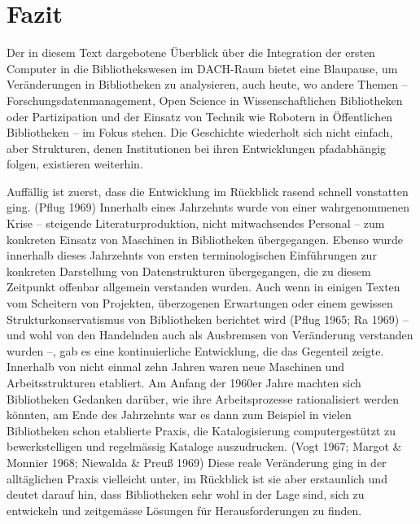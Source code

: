 \documentclass[a4paper,
fontsize=11pt,
oneside,
numbers=noperiodatend,
parskip=half-,
bibliography=totoc,
final
]{scrartcl}
\begin{document}
\hypertarget{fazit}{%
\section{Fazit}\label{fazit}}

Der in diesem Text dargebotene Überblick über die Integration der ersten
Computer in die Bibliothekswesen im DACH-Raum bietet eine Blaupause, um
Veränderungen in Bibliotheken zu analysieren, auch heute, wo andere
Themen -- Forschungsdatenmanagement, Open Science in Wissenschaftlichen
Bibliotheken oder Partizipation und der Einsatz von Technik wie Robotern
in Öffentlichen Bibliotheken -- im Fokus stehen. Die Geschichte
wiederholt sich nicht einfach, aber Strukturen, denen Institutionen bei
ihren Entwicklungen pfadabhängig folgen, existieren weiterhin.

Auffällig ist zuerst, dass die Entwicklung im Rückblick rasend schnell
vonstatten ging. (Pflug 1969) Innerhalb eines Jahrzehnts wurde von einer
wahrgenommenen Krise -- steigende Literaturproduktion, nicht
mitwachsendes Personal -- zum konkreten Einsatz von Maschinen in
Bibliotheken übergegangen. Ebenso wurde innerhalb dieses Jahrzehnts von
ersten terminologischen Einführungen zur konkreten Darstellung von
Datenstrukturen übergegangen, die zu diesem Zeitpunkt offenbar allgemein
verstanden wurden. Auch wenn in einigen Texten vom Scheitern von
Projekten, überzogenen Erwartungen oder einem gewissen
Strukturkonservatismus von Bibliotheken berichtet wird (Pflug 1965; Ra
1969) -- und wohl von den Handelnden auch als Ausbremsen von Veränderung
verstanden wurden --, gab es eine kontinuierliche Entwicklung, die das
Gegenteil zeigte. Innerhalb von nicht einmal zehn Jahren waren neue
Maschinen und Arbeitsstrukturen etabliert. Am Anfang der 1960er Jahre
machten sich Bibliotheken Gedanken darüber, wie ihre Arbeitsprozesse
rationalisiert werden könnten, am Ende des Jahrzehnts war es dann zum
Beispiel in vielen Bibliotheken schon etablierte Praxis, die
Katalogisierung computergestützt zu bewerkstelligen und regelmässig
Kataloge auszudrucken. (Vogt 1967; Margot \& Monnier 1968; Niewalda \&
Preuß 1969) Diese reale Veränderung ging in der alltäglichen Praxis
vielleicht unter, im Rückblick ist sie aber erstaunlich und deutet
darauf hin, dass Bibliotheken sehr wohl in der Lage sind, sich zu
entwickeln und zeitgemässe Lösungen für Herausforderungen zu finden.
\end{document}
